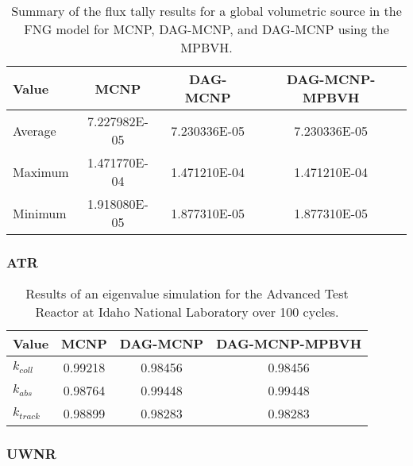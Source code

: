   \begin{table}[H]
    \small
    \begin{center}
      \begin{tabular}{lccc}
        \toprule
        Value & MCNP & DAG-MCNP & DAG-MCNP-MPBVH \\
        \hline
        Average & 7.227982E-05 & 7.230336E-05 & 7.230336E-05 \\
        Maximum & 1.471770E-04 & 1.471210E-04 & 1.471210E-04 \\
        Minimum & 1.918080E-05 & 1.877310E-05 & 1.877310E-05 \\
        \bottomrule
      \end{tabular}
    \end{center}
    \caption[Flux tally results in FNG for various DAG-MCNP
      implementations.]{Summary of the flux tally results for a global
      volumetric source in the FNG model for MCNP, DAG-MCNP, and DAG-MCNP using
      the MPBVH.}
  \end{table}

  \subsubsection{ATR}

  \begin{table}[H]
    \small
    \begin{center}
      \begin{tabular}{lccc}
        \toprule
        Value & MCNP & DAG-MCNP & DAG-MCNP-MPBVH \\
        \toprule
        $k_{coll}$  & 0.99218 & 0.98456 & 0.98456  \\
        $k_{abs}$   & 0.98764 & 0.99448 & 0.99448  \\
        $k_{track}$ & 0.98899 & 0.98283 & 0.98283  \\
        \bottomrule
      \end{tabular}
    \end{center}
    \caption[Results of eigenvalue simulations in ATR for various DAG-MCNP
      implementations.]{Results of an eigenvalue simulation for the Advanced
      Test Reactor at Idaho National Laboratory over 100 cycles.}
  \end{table}

  \subsubsection{UWNR}

